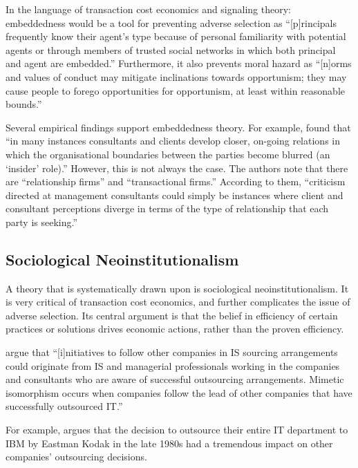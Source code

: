 \documentclass[12pt]{article}
\begin{document}
In the language of transaction cost economics and signaling theory:
embeddedness would be a tool for preventing adverse selection as
``{[}p{]}rincipals frequently know their agent's type because of
personal familiarity with potential agents or through members of trusted
social networks in which both principal and agent are embedded.''
\citep[ 277]{shapiro2005} Furthermore, it also prevents moral hazard as
``{[}n{]}orms and values of conduct may mitigate inclinations towards
opportunism; they may cause people to forego opportunities for
opportunism, at least within reasonable bounds.'' \citep[
990]{nooteboom1996}

Several empirical findings support embeddedness theory. For example,
\citet[15]{kitay2004} found that ``in many instances consultants and
clients develop closer, on-going relations in which the organisational
boundaries between the parties become blurred (an `insider' role).''
However, this is not always the case. The authors note that there are
``relationship firms'' and ``transactional firms.'' According to them,
``criticism directed at management consultants could simply be instances
where client and consultant perceptions diverge in terms of the type of
relationship that each party is seeking.''

\subsection{Sociological
Neoinstitutionalism}\label{sociological-neoinstitutionalism}

A theory that is systematically drawn upon \citep[ 6-8]{armbruster2006}
is sociological neoinstitutionalism. It is very critical of transaction
cost economics, and further complicates the issue of adverse selection.
Its central argument is that the belief in efficiency of certain
practices or solutions drives economic actions, rather than the proven
efficiency.

\citet[120]{jayatilaka2006} argue that ``{[}i{]}nitiatives to follow
other companies in IS sourcing arrangements could originate from IS and
managerial professionals working in the companies and consultants who
are aware of successful outsourcing arrangements. Mimetic isomorphism
occurs when companies follow the lead of other companies that have
successfully outsourced IT.''

For example, \citet[350]{loh1992} argues that the decision to outsource
their entire IT department to IBM by Eastman Kodak in the late 1980s had
a tremendous impact on other companies' outsourcing decisions.
\end{document}
